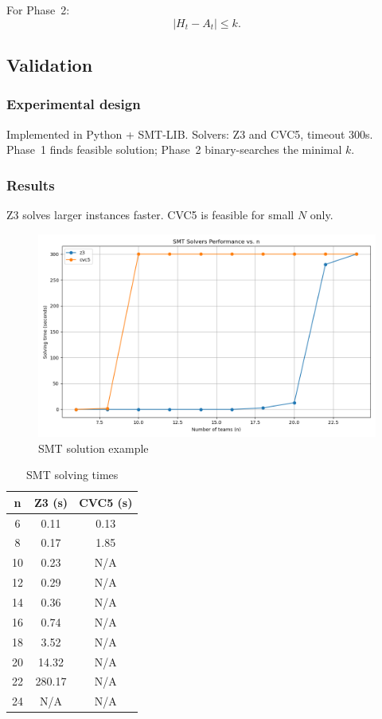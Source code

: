 For Phase~2:
\[
|H_t - A_t| \leq k.
\]

\subsection{Validation}

\subsubsection{Experimental design}

Implemented in Python + SMT-LIB. Solvers: Z3 and CVC5, timeout 300s. Phase~1 finds feasible solution; Phase~2 binary-searches the minimal $k$.

\subsubsection{Results}

Z3 solves larger instances faster. CVC5 is feasible for small $N$ only.

\begin{figure}[h!]
  \centering
  \includegraphics[width=0.8\linewidth]{img/SMT-result.png}
  \caption{SMT solution example}
  \label{fig:smt-result}
\end{figure}

\begin{table}[htbp]
\centering
\small
\begin{tabular}{|c|c|c|}
\toprule
\textbf{n} & \textbf{Z3 (s)} & \textbf{CVC5 (s)} \\
\midrule
6  & 0.11 & 0.13 \\
8  & 0.17 & 1.85 \\
10 & 0.23 & N/A \\
12 & 0.29 & N/A \\
14 & 0.36 & N/A \\
16 & 0.74 & N/A \\
18 & 3.52 & N/A \\
20 & 14.32 & N/A \\
22 & 280.17 & N/A \\
24 & N/A & N/A \\
\bottomrule
\end{tabular}
\caption{SMT solving times}
\label{table:smt-result}
\end{table}
